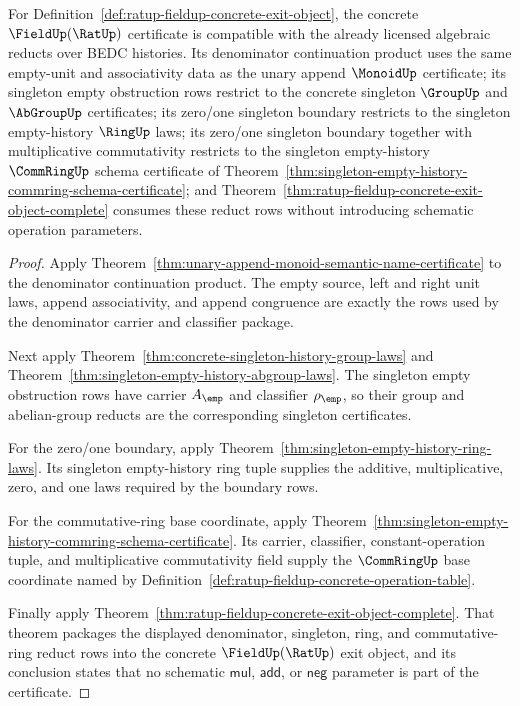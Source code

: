 \begin{theorem}
\label{thm:ratup-fieldup-algebra-reduct-compatibility}
For Definition~\ref{def:ratup-fieldup-concrete-exit-object}, the concrete
$\FieldUp(\RatUp)$ certificate is compatible with the already licensed algebraic
reducts over BEDC histories. Its denominator continuation product uses the same
empty-unit and associativity data as the unary append $\MonoidUp$ certificate;
its singleton empty obstruction rows restrict to the concrete singleton
$\GroupUp$ and $\AbGroupUp$ certificates; its zero/one singleton boundary
restricts to the singleton empty-history $\RingUp$ laws; its zero/one
singleton boundary together with multiplicative commutativity restricts to the
singleton empty-history $\CommRingUp$ schema certificate of
Theorem~\ref{thm:singleton-empty-history-commring-schema-certificate}; and
Theorem~\ref{thm:ratup-fieldup-concrete-exit-object-complete} consumes these
reduct rows without introducing schematic operation parameters.
\end{theorem}
\begin{proof}
Apply Theorem~\ref{thm:unary-append-monoid-semantic-name-certificate} to the
denominator continuation product. The empty source, left and right unit laws,
append associativity, and append congruence are exactly the rows used by the
denominator carrier and classifier package.

Next apply Theorem~\ref{thm:concrete-singleton-history-group-laws} and
Theorem~\ref{thm:singleton-empty-history-abgroup-laws}. The singleton empty
obstruction rows have carrier $A_{\emp}$ and classifier $\rho_{\emp}$, so their
group and abelian-group reducts are the corresponding singleton certificates.

For the zero/one boundary, apply
Theorem~\ref{thm:singleton-empty-history-ring-laws}. Its singleton
empty-history ring tuple supplies the additive, multiplicative, zero, and one
laws required by the boundary rows.

For the commutative-ring base coordinate, apply
Theorem~\ref{thm:singleton-empty-history-commring-schema-certificate}. Its
carrier, classifier, constant-operation tuple, and multiplicative commutativity
field supply the $\CommRingUp$ base coordinate named by
Definition~\ref{def:ratup-fieldup-concrete-operation-table}.

Finally apply Theorem~\ref{thm:ratup-fieldup-concrete-exit-object-complete}.
That theorem packages the displayed denominator, singleton, ring, and
commutative-ring reduct rows into the concrete $\FieldUp(\RatUp)$ exit object,
and its conclusion states that no schematic $\mathsf{mul}$, $\mathsf{add}$, or
$\mathsf{neg}$ parameter is part of the certificate.
\end{proof}

